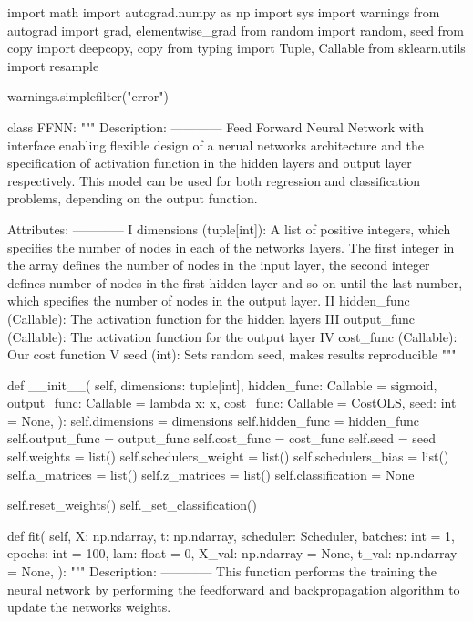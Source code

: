 \documentclass[%
oneside,                 %
final,                   %
10pt]{article}
\begin{document}
\bpycod
import math
import autograd.numpy as np
import sys
import warnings
from autograd import grad, elementwise_grad
from random import random, seed
from copy import deepcopy, copy
from typing import Tuple, Callable
from sklearn.utils import resample

warnings.simplefilter("error")


class FFNN:
    """
    Description:
    ------------
        Feed Forward Neural Network with interface enabling flexible design of a
        nerual networks architecture and the specification of activation function
        in the hidden layers and output layer respectively. This model can be used
        for both regression and classification problems, depending on the output function.

    Attributes:
    ------------
        I   dimensions (tuple[int]): A list of positive integers, which specifies the
            number of nodes in each of the networks layers. The first integer in the array
            defines the number of nodes in the input layer, the second integer defines number
            of nodes in the first hidden layer and so on until the last number, which
            specifies the number of nodes in the output layer.
        II  hidden_func (Callable): The activation function for the hidden layers
        III output_func (Callable): The activation function for the output layer
        IV  cost_func (Callable): Our cost function
        V   seed (int): Sets random seed, makes results reproducible
    """

    def __init__(
        self,
        dimensions: tuple[int],
        hidden_func: Callable = sigmoid,
        output_func: Callable = lambda x: x,
        cost_func: Callable = CostOLS,
        seed: int = None,
    ):
        self.dimensions = dimensions
        self.hidden_func = hidden_func
        self.output_func = output_func
        self.cost_func = cost_func
        self.seed = seed
        self.weights = list()
        self.schedulers_weight = list()
        self.schedulers_bias = list()
        self.a_matrices = list()
        self.z_matrices = list()
        self.classification = None

        self.reset_weights()
        self._set_classification()

    def fit(
        self,
        X: np.ndarray,
        t: np.ndarray,
        scheduler: Scheduler,
        batches: int = 1,
        epochs: int = 100,
        lam: float = 0,
        X_val: np.ndarray = None,
        t_val: np.ndarray = None,
    ):
        """
        Description:
        ------------
            This function performs the training the neural network by performing the feedforward and backpropagation
            algorithm to update the networks weights.
\end{document}
